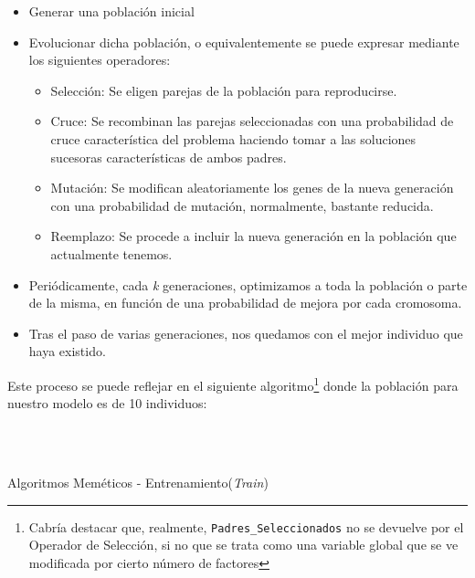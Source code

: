 \documentclass[a4paper, 11pt]{article}
\begin{document}
			\begin{itemize}
				\item Generar una población inicial
				\item Evolucionar dicha población, o equivalentemente se puede expresar mediante los
				siguientes operadores:
					\begin{itemize}
						\item Selección: Se eligen parejas de la población para reproducirse.
						\item Cruce: Se recombinan las parejas seleccionadas con una probabilidad de
						cruce característica del problema haciendo tomar a las soluciones sucesoras
						características de ambos padres.
						\item Mutación: Se modifican aleatoriamente los genes de la nueva generación
						con una probabilidad de mutación, normalmente, bastante reducida.
						\item Reemplazo: Se procede a incluir la nueva generación en la población
						que actualmente tenemos.
					\end{itemize}
				\item Periódicamente, cada \textit{k} generaciones, optimizamos a toda la población o
				parte de la misma, en función de una probabilidad de mejora por cada cromosoma.
				\item Tras el paso de varias generaciones, nos quedamos con el mejor individuo que
				haya existido.
			\end{itemize}
			
			Este proceso se puede reflejar en el siguiente algoritmo\footnote{Cabría destacar que,
			realmente, \texttt{Padres\_Seleccionados} no se devuelve por el Operador de Selección, si
			no que se trata como una variable global que se ve modificada por cierto número de factores}
			donde la población para nuestro modelo es de 10 individuos:
			
			\begin{algorithm}[H]
				\begin{algorithmic}[1]
				\REQUIRE \ \\
				 \
	 
					\ENDIF
				\ENDFOR
				
				
					\ENDFOR
					\ENDIF
				\ENDWHILE
				
				\end{algorithmic}
			\caption{Algoritmos Meméticos - Entrenamiento(\textit{Train})}
			\label{MA-Train}
			\end{algorithm}
			
\end{document}

